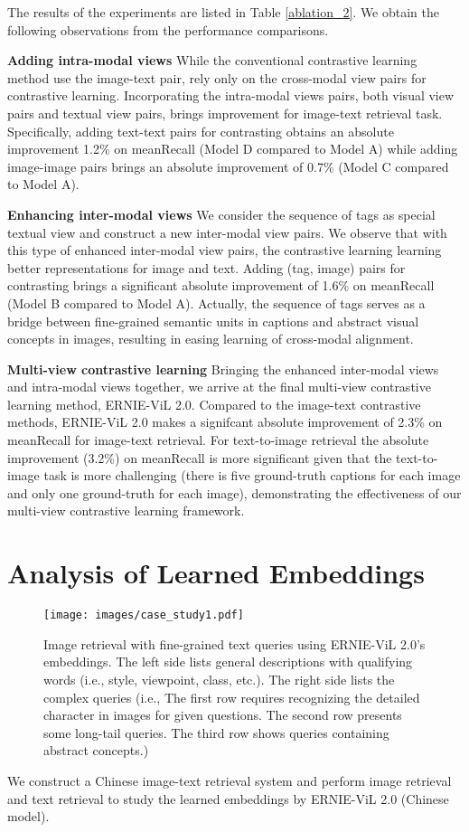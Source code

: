 \documentclass{article}
\begin{document}
The results of the experiments are listed in Table \ref{ablation_2}. We  obtain the following observations from the performance comparisons.  


\noindent\textbf{Adding intra-modal views} While the conventional contrastive learning method use the image-text pair, rely only on the cross-modal view pairs for contrastive learning. Incorporating the intra-modal views pairs, both visual view pairs and textual view pairs,  brings improvement for image-text retrieval task. Specifically, adding text-text pairs for contrasting obtains an absolute improvement 1.2\% on meanRecall  (Model D compared to Model A) while adding image-image pairs brings an absolute improvement of 0.7\% (Model C compared to Model A). 

\noindent\textbf{Enhancing inter-modal views} 
We consider the sequence of tags as special textual view and construct a new inter-modal view pairs. We observe that with this type of enhanced inter-modal view pairs, the contrastive learning learning better representations for image and text. Adding (tag, image) pairs for contrasting brings a significant absolute improvement of 1.6\% on meanRecall (Model B compared to Model A). 
Actually, the sequence of tags serves as a bridge between fine-grained semantic units in captions and abstract visual concepts in images, resulting in easing learning of cross-modal alignment. 

\noindent\textbf{Multi-view contrastive learning} Bringing the enhanced inter-modal views and intra-modal views together, we arrive at the final multi-view contrastive learning method, ERNIE-ViL 2.0. Compared to the image-text contrastive methods, ERNIE-ViL 2.0 makes a signifcant absolute improvement of 2.3\% on meanRecall for image-text retrieval. For text-to-image retrieval the absolute improvement (3.2\%) on meanRecall is more significant given that the text-to-image task is more challenging (there is five ground-truth captions for each image and only one ground-truth for each image), demonstrating the effectiveness of our multi-view contrastive learning framework.  



\section{Analysis of Learned Embeddings}
\begin{figure}[]
\centering
\texttt{[image: images/case\_study1.pdf]}
\caption{Image retrieval with fine-grained text queries using ERNIE-ViL 2.0's embeddings. The left side lists general descriptions with qualifying words (i.e., style, viewpoint, class, etc.). The right side lists the complex queries (i.e., The first row requires recognizing the detailed character in images for given questions. The second row presents some long-tail queries. The third row shows queries containing abstract concepts.) }
\label{case_t2i_1}
\end{figure} 
We construct a Chinese image-text retrieval system and perform image retrieval and text retrieval to study the learned embeddings by ERNIE-ViL 2.0 (Chinese model).
\end{document}
